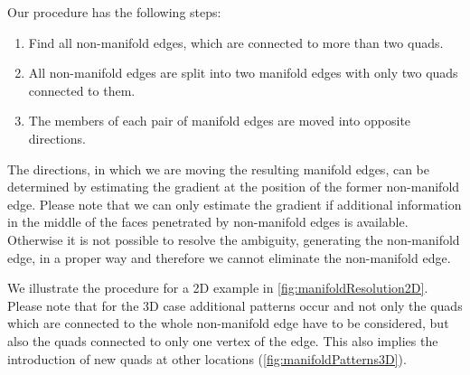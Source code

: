 Our procedure has the following steps:
\begin{enumerate}
\item Find all non-manifold edges, which are connected to more than two \acp{quad}.
\item All non-manifold edges are split into two manifold edges with only two \acp{quad} connected to them.
\item The members of each pair of manifold edges are moved into opposite directions. 
\end{enumerate}
The directions, in which we are moving the resulting manifold edges, can be determined by estimating the gradient at the position of the former non-manifold edge. Please note that we can only estimate the gradient if additional information in the middle of the faces penetrated by non-manifold edges is available. Otherwise it is not possible to resolve the ambiguity, generating the non-manifold edge, in a proper way and therefore we cannot eliminate the non-manifold edge.

We illustrate the procedure for a 2D example in \autoref{fig:manifoldResolution2D}. Please note that for the 3D case additional patterns occur and not only the \acp{quad} which are connected to the whole non-manifold edge have to be considered, but also the \acp{quad} connected to only one vertex of the edge. This also implies the introduction of new \acp{quad} at other locations (\autoref{fig:manifoldPatterns3D}).

